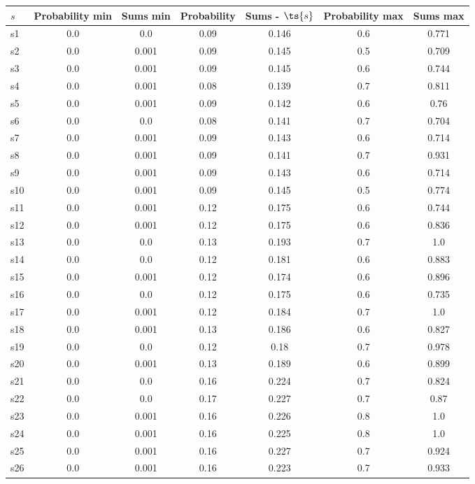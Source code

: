 \documentclass{article}
\begin{document}
\noindent\begin{tabular}{|l|c|c|c|c|c|c|}
\hline
$s$& Probability min & Sums min & Probability & Sums - $\ts{s}$ & Probability max & Sums max\\
\hline
s1 &0.0 & 0.0 & 0.09 & 0.146 & 0.6 & 0.771\\
\hline
s2 &0.0 & 0.001 & 0.09 & 0.145 & 0.5 & 0.709\\
\hline
s3 &0.0 & 0.001 & 0.09 & 0.145 & 0.6 & 0.744\\
\hline
s4 &0.0 & 0.001 & 0.08 & 0.139 & 0.7 & 0.811\\
\hline
s5 &0.0 & 0.001 & 0.09 & 0.142 & 0.6 & 0.76\\
\hline
s6 &0.0 & 0.0 & 0.08 & 0.141 & 0.7 & 0.704\\
\hline
s7 &0.0 & 0.001 & 0.09 & 0.143 & 0.6 & 0.714\\
\hline
s8 &0.0 & 0.001 & 0.09 & 0.141 & 0.7 & 0.931\\
\hline
s9 &0.0 & 0.001 & 0.09 & 0.143 & 0.6 & 0.714\\
\hline
s10 &0.0 & 0.001 & 0.09 & 0.145 & 0.5 & 0.774\\
\hline
s11 &0.0 & 0.001 & 0.12 & 0.175 & 0.6 & 0.744\\
\hline
s12 &0.0 & 0.001 & 0.12 & 0.175 & 0.6 & 0.836\\
\hline
s13 &0.0 & 0.0 & 0.13 & 0.193 & 0.7 & 1.0\\
\hline
s14 &0.0 & 0.0 & 0.12 & 0.181 & 0.6 & 0.883\\
\hline
s15 &0.0 & 0.001 & 0.12 & 0.174 & 0.6 & 0.896\\
\hline
s16 &0.0 & 0.0 & 0.12 & 0.175 & 0.6 & 0.735\\
\hline
s17 &0.0 & 0.001 & 0.12 & 0.184 & 0.7 & 1.0\\
\hline
s18 &0.0 & 0.001 & 0.13 & 0.186 & 0.6 & 0.827\\
\hline
s19 &0.0 & 0.0 & 0.12 & 0.18 & 0.7 & 0.978\\
\hline
s20 &0.0 & 0.001 & 0.13 & 0.189 & 0.6 & 0.899\\
\hline
s21 &0.0 & 0.0 & 0.16 & 0.224 & 0.7 & 0.824\\
\hline
s22 &0.0 & 0.0 & 0.17 & 0.227 & 0.7 & 0.87\\
\hline
s23 &0.0 & 0.001 & 0.16 & 0.226 & 0.8 & 1.0\\
\hline
s24 &0.0 & 0.001 & 0.16 & 0.225 & 0.8 & 1.0\\
\hline
s25 &0.0 & 0.001 & 0.16 & 0.227 & 0.7 & 0.924\\
\hline
s26 &0.0 & 0.001 & 0.16 & 0.223 & 0.7 & 0.933\\

\end{tabular}
\end{document}
